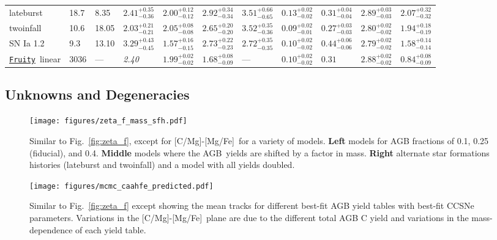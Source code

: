 \documentclass[fleqn,
referee, %
usenatbib]{mnras}
\newcommand{\fruity}{\texttt{\hyperlink{fruity}{Fruity}}}
\newcommand{\agb}{AGB}
\newcommand{\caafe}{[C/Mg]-[Mg/Fe]}
\begin{document}
\begin{table}
{\begin{tabular}{l l l l l l l l l l l}
lateburst        &     18.7 &     8.35 & $2.41^{+0.35}_{-0.36}$  &  $2.00^{+0.12}_{-0.12}$  &  $2.92^{+0.34}_{-0.34}$  &  $3.51^{+0.66}_{-0.65}$  &  $0.13^{+0.02}_{-0.02}$  &  $0.31^{+0.04}_{-0.04}$  &  $2.89^{+0.03}_{-0.03}$  &  $2.07^{+0.32}_{-0.32}$\\ 
twoinfall        &     10.6 &    18.05 & $2.03^{+0.21}_{-0.21}$  &  $2.05^{+0.08}_{-0.08}$  &  $2.65^{+0.20}_{-0.20}$  &  $3.52^{+0.35}_{-0.36}$  &  $0.09^{+0.02}_{-0.01}$  &  $0.27^{+0.03}_{-0.03}$  &  $2.80^{+0.02}_{-0.02}$  &  $1.94^{+0.18}_{-0.19}$\\ 
SN Ia 1.2        &      9.3 &    13.10 & $3.29^{+0.43}_{-0.45}$  &  $1.57^{+0.16}_{-0.15}$  &  $2.73^{+0.22}_{-0.23}$  &  $2.72^{+0.35}_{-0.35}$  &  $0.10^{+0.02}_{-0.02}$  &  $0.44^{+0.06}_{-0.06}$  &  $2.79^{+0.02}_{-0.02}$  &  $1.58^{+0.14}_{-0.14}$\\ 
\fruity\ linear  &   3036 &    --- & {\it 2.40}  &  $1.99^{+0.02}_{-0.02}$  &  $1.68^{+0.08}_{-0.09}$  &  ---  &  $0.10^{+0.02}_{-0.02}$  &  $0.31$  &  $2.88^{+0.02}_{-0.02}$  &  $0.84^{+0.08}_{-0.09}$\\ 

\hline
    \end{tabular}

}
    
\end{table}


\subsection{Unknowns and Degeneracies} \label{sec:sfh} \label{sec:outflows}
\label{sec:degeneracies}

\begin{figure}
    \texttt{[image: figures/zeta\_f\_mass\_sfh.pdf]}
    
    \caption[]{
        Similar to Fig.~\ref{fig:zeta_f}, except for \caafe\ for a variety of models.
        {\bf Left} models for AGB fractions of 0.1, 0.25 (fiducial), and 0.4. 
        {\bf Middle} models where the \agb\ yields are shifted by a factor in mass.
        {\bf Right} alternate star formations histories (lateburst and twoinfall) and a model with all yields doubled.
    }
    \label{fig:sims_degens}
\end{figure}

\begin{figure}
    \texttt{[image: figures/mcmc\_caahfe\_predicted.pdf]}

    \caption[]{
        Similar to Fig.~\ref{fig:zeta_f} except showing the mean tracks for different best-fit AGB yield tables with best-fit CCSNe parameters. Variations in the \caafe\ plane are due to the different total AGB C yield and variations in the mass-dependence of each yield table.
    }
    \label{fig:agb_predictions}
\end{figure}
\end{document}

